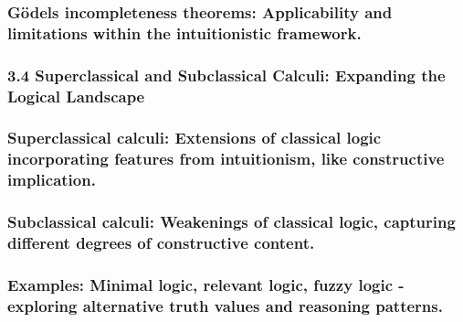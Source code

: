 \hypertarget{guxf6dels-incompleteness-theorems-applicability-and-limitations-within-the-intuitionistic-framework.}{%
\subsubsection{Gödel\textquotesingle s incompleteness theorems:
Applicability and limitations within the intuitionistic
framework.}\label{guxf6dels-incompleteness-theorems-applicability-and-limitations-within-the-intuitionistic-framework.}}

\hypertarget{superclassical-and-subclassical-calculi-expanding-the-logical-landscape}{%
\subsubsection*{\texorpdfstring{\textbf{3.4 Superclassical and
Subclassical Calculi: Expanding the Logical
Landscape}}{3.4 Superclassical and Subclassical Calculi: Expanding the Logical Landscape}}\label{superclassical-and-subclassical-calculi-expanding-the-logical-landscape}}

\hypertarget{superclassical-calculi-extensions-of-classical-logic-incorporating-features-from-intuitionism-like-constructive-implication.}{%
\subsubsection{Superclassical calculi: Extensions of classical logic
incorporating features from intuitionism, like constructive
implication.}\label{superclassical-calculi-extensions-of-classical-logic-incorporating-features-from-intuitionism-like-constructive-implication.}}

\hypertarget{subclassical-calculi-weakenings-of-classical-logic-capturing-different-degrees-of-constructive-content.}{%
\subsubsection{Subclassical calculi: Weakenings of classical logic,
capturing different degrees of constructive
content.}\label{subclassical-calculi-weakenings-of-classical-logic-capturing-different-degrees-of-constructive-content.}}

\hypertarget{examples-minimal-logic-relevant-logic-fuzzy-logic---exploring-alternative-truth-values-and-reasoning-patterns.}{%
\subsubsection{Examples: Minimal logic, relevant logic, fuzzy logic -
exploring alternative truth values and reasoning
patterns.}\label{examples-minimal-logic-relevant-logic-fuzzy-logic---exploring-alternative-truth-values-and-reasoning-patterns.}}

